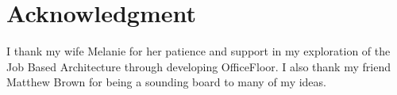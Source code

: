 \documentclass[conference]{ieee/IEEEtran}
\begin{document}


\section*{Acknowledgment} I thank my wife Melanie for her patience and support
in my exploration of the Job Based Architecture through developing OfficeFloor. 
I also thank my friend Matthew Brown for being a sounding board to many of my
ideas.



%
%



%
%
\end{document}
